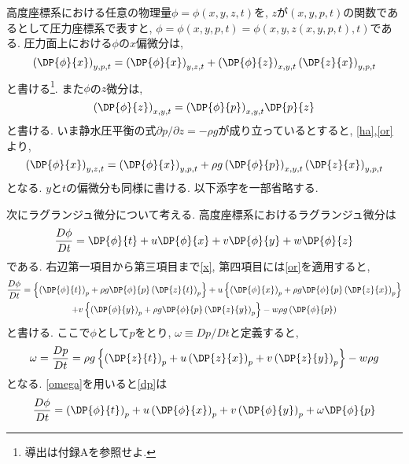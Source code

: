 \documentclass[a4j,12pt,openbib,oneside,dvipdfmx]{jarticle}
\begin{document}
高度座標系における任意の物理量$\phi=\phi(x,y,z,t)$を, $z$が$(x,y,p,t)$の関数であるとして圧力座標系で表すと, $\phi=\phi(x,y,p,t)=\phi(x,y,z(x,y,p,t),t)$である. 圧力面上における$\phi$の$x$偏微分は, 
\begin{equation}
  \left(\DP{\phi}{x}\right)_{y,p,t}=\left(\DP{\phi}{x}\right)_{y,z,t}+\left(\DP{\phi}{z}\right)_{x,y,t}\left(\DP{z}{x}\right)_{y,p,t} \label{ha}
\end{equation}
と書ける\footnote{導出は付録Aを参照せよ.}. また$\phi$の$z$微分は,
\begin{equation}
  \left(\DP{\phi}{z}\right)_{x,y,t}={\left(\DP{\phi}{p}\right)_{x,y,t}}\DP{p}{z} \label{or}
\end{equation}
と書ける. いま静水圧平衡の式$\partial{p}/\partial{z}=-\rho{g}$が成り立っているとすると, \eqref{ha},\eqref{or}より,
\begin{equation}
  \left(\DP{\phi}{x}\right)_{y,z,t}=\left(\DP{\phi}{x}\right)_{y,p,t}+\rho{g}\left(\DP{\phi}{p}\right)_{x,y,t}\left(\DP{z}{x}\right)_{y,p,t} \label{x}
\end{equation}
となる. $y$と$t$の偏微分も同様に書ける. 以下添字を一部省略する. \\
\par
次にラグランジュ微分について考える. 高度座標系におけるラグランジュ微分は
\begin{equation}
  \frac{D\phi}{Dt}=\DP{\phi}{t}+u\DP{\phi}{x}+v\DP{\phi}{y}+w\DP{\phi}{z}
\end{equation}
である. 右辺第一項目から第三項目まで\eqref{x}, 第四項目には\eqref{or}を適用すると,
\begin{multline}
  \frac{D\phi}{Dt}=\left\{\left(\DP{\phi}{t}\right)_p+\rho{g}\DP{\phi}{p}\left(\DP{z}{t}\right)_p\right\}+u\left\{\left(\DP{\phi}{x}\right)_p+\rho{g}\DP{\phi}{p}\left(\DP{z}{x}\right)_p\right\}\\
  +v\left\{\left(\DP{\phi}{y}\right)_p+\rho{g}\DP{\phi}{p}\left(\DP{z}{y}\right)_p\right\}-w\rho{g}\left(\DP{\phi}{p}\right) \label{dp}
\end{multline}
と書ける. ここで$\phi$として$p$をとり, $\omega\equiv{Dp/Dt}$と定義すると,
\begin{equation}
  \omega=\frac{Dp}{Dt}=\rho{g}\left\{\left(\DP{z}{t}\right)_p+u\left(\DP{z}{x}\right)_p+v\left(\DP{z}{y}\right)_p\right\}-w\rho{g} \label{omega}
\end{equation}
となる. \eqref{omega}を用いると\eqref{dp}は
\begin{equation}
  \frac{D\phi}{Dt}=\left(\DP{\phi}{t}\right)_p+u\left(\DP{\phi}{x}\right)_p+v\left(\DP{\phi}{y}\right)_p+\omega{\DP{\phi}{p}} \label{dd}
\end{equation}
\end{document}
